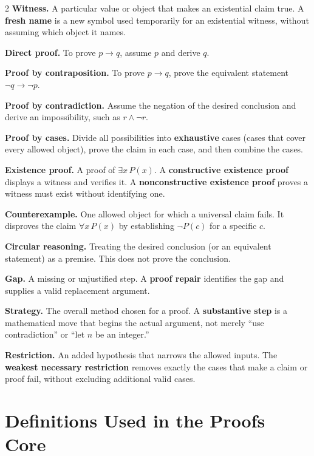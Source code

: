 \documentclass[10pt]{article}
\newcommand{\term}[1]{\textbf{\color{ProofNavy}#1}}
\begin{document}
\begin{multicols}{2}
\term{Witness.} A particular value or object that makes an existential claim
true. A \term{fresh name} is a new symbol used temporarily for an existential
witness, without assuming which object it names.

\term{Direct proof.} To prove $p\to q$, assume $p$ and derive $q$.

\term{Proof by contraposition.} To prove $p\to q$, prove the equivalent
statement $\neg q\to\neg p$.

\term{Proof by contradiction.} Assume the negation of the desired conclusion
and derive an impossibility, such as $r\land\neg r$.

\term{Proof by cases.} Divide all possibilities into \term{exhaustive} cases
(cases that cover every allowed object), prove the claim in each case, and then
combine the cases.

\term{Existence proof.} A proof of $\exists x\,P(x)$. A
\term{constructive existence proof} displays a witness and verifies it. A
\term{nonconstructive existence proof} proves a witness must exist without
identifying one.

\term{Counterexample.} One allowed object for which a universal claim fails.
It disproves the claim $\forall x\,P(x)$ by establishing $\neg P(c)$ for a
specific $c$.

\term{Circular reasoning.} Treating the desired conclusion (or an equivalent
statement) as a premise. This does not prove the conclusion.

\term{Gap.} A missing or unjustified step. A \term{proof repair} identifies the
gap and supplies a valid replacement argument.

\term{Strategy.} The overall method chosen for a proof. A
\term{substantive step} is a mathematical move that begins the actual argument,
not merely ``use contradiction'' or ``let $n$ be an integer.''

\term{Restriction.} An added hypothesis that narrows the allowed inputs. The
\term{weakest necessary restriction} removes exactly the cases that make a
claim or proof fail, without excluding additional valid cases.
\end{multicols}

\clearpage
\section*{Definitions Used in the Proofs Core}
\end{document}
